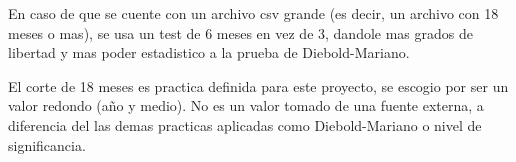En caso de que se cuente con un archivo csv grande (es decir, un archivo con 18 meses o mas), se usa un test de 6 meses en vez de 3, dandole mas grados de libertad y mas poder estadistico a la prueba de Diebold-Mariano. 

El corte de 18 meses es practica definida para este proyecto, se escogio por ser un valor redondo (año y medio). No es un valor tomado de una fuente externa, a diferencia del las demas practicas aplicadas como Diebold-Mariano o nivel de significancia.